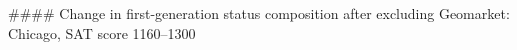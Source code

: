 #### Change in first-generation status composition after excluding Geomarket: Chicago, SAT score 1160–1300
